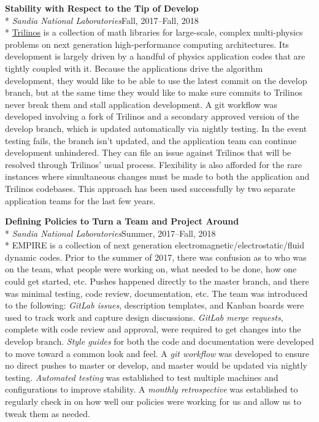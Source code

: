 \documentclass[margin,line,pifont,palatino,10pt]{res}
\begin{document}
\begin{resume}
{\bf Stability with Respect to the Tip of Develop}\\*
{\it Sandia National Laboratories}\hfill Fall, 2017--Fall, 2018\\*
\href{https://trilinos.github.io}{Trilinos} is a collection of math libraries for large-scale, complex multi-physics problems on next generation high-performance computing architectures.  Its development is largely driven by a handful of physics application codes that are tightly coupled with it.  Because the applications drive the algorithm development, they would like to be able to use the latest commit on the develop branch, but at the same time they would like to make sure commits to Trilinos never break them and stall application development.  A git workflow was developed involving a fork of Trilinos and a secondary approved version of the develop branch, which is updated automatically via nightly testing.  In the event testing fails, the branch isn't updated, and the application team can continue development unhindered.  They can file an issue against Trilinos that will be resolved through Trilinos' usual process.  Flexibility is also afforded for the rare instances where simultaneous changes must be made to both the application and Trilinos codebases.  This approach has been used successfully by two separate application teams for the last few years.

{\bf Defining Policies to Turn a Team and Project Around}\\*
{\it Sandia National Laboratories}\hfill Summer, 2017--Fall, 2018\\*
EMPIRE is a collection of next generation electromagnetic/electrostatic/fluid dynamic codes.  Prior to the summer of 2017, there was confusion as to who was on the team, what people were working on, what needed to be done, how one could get started, etc.  Pushes happened directly to the master branch, and there was minimal testing, code review, documentation, etc.  The team was introduced to the following:  \emph{GitLab issues}, description templates, and Kanban boards were used to track work and capture design discussions.  \emph{GitLab merge requests}, complete with code review and approval, were required to get changes into the develop branch.  \emph{Style guides} for both the code and documentation were developed to move toward a common look and feel.  A \emph{git workflow} was developed to ensure no direct pushes to master or develop, and master would be updated via nightly testing.  \emph{Automated testing} was established to test multiple machines and configurations to improve stability.  A \emph{monthly retrospective} was established to regularly check in on how well our policies were working for us and allow us to tweak them as needed.


\end{resume}
\end{document}
